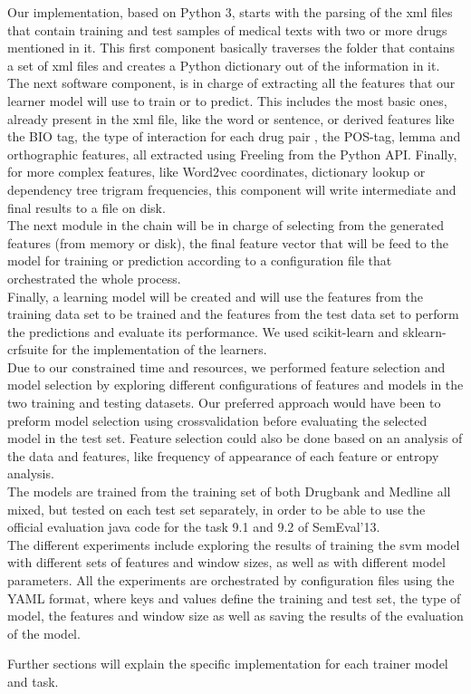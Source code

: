    Our implementation, based on Python 3, starts with the parsing of the xml files that contain training and test samples of medical texts with two or more drugs mentioned in it. This first component basically traverses the folder that contains a set of xml files and creates a Python dictionary out of the information in it.\\
   The next software component, is in charge of extracting all the features that our learner model will use to train or to predict. This includes the most basic ones, already present in the xml file, like the word or sentence, or derived features like the BIO tag, the type of interaction for each drug pair , the POS-tag, lemma and orthographic features, all extracted using Freeling from the Python API. Finally, for more complex features, like Word2vec coordinates, dictionary lookup or dependency tree trigram frequencies, this component will write intermediate and final results to a file on disk.\\
   The next module in the chain will be in charge of selecting from the generated features (from memory or disk), the final feature vector that will be feed to the model for training or prediction  according to a configuration file that orchestrated the whole process.\\
   Finally, a learning model will be created and will use the features from the training data set to be trained and the features from the test data set to perform the predictions and evaluate its performance. We used scikit-learn and sklearn-crfsuite for the implementation of the learners.\\
   Due to our constrained time and resources, we performed feature selection and model selection by exploring different configurations of features and models in the two training and testing datasets. Our preferred approach would have been to preform model selection using crossvalidation before evaluating the selected model in the test set. Feature selection could also be done based on an analysis of the data and features, like frequency of appearance of each feature or entropy analysis.\\
   
   The models are trained from the training set of both Drugbank and Medline all mixed, but tested on each test set separately, in order to be able to use the official evaluation java code for the task 9.1 and 9.2 of SemEval'13. \\
   
The different experiments include exploring the results of training the svm model with different sets of features and window sizes, as well as with different model parameters. All the experiments are orchestrated by configuration files using the YAML format, where keys and values define the training and test set, the type of model, the features and window size as well as saving the results of the evaluation of the model.

  Further sections will explain the specific implementation for each trainer model and task.
    
